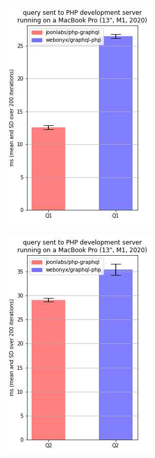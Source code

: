 \documentclass[11pt, a4paper]{article}
\begin{document}
\clearpage
\begin{figure}
\centering
\begin{subfigure}{.5\textwidth}
  \centering
  \includegraphics[width=.75\linewidth]{results/localhost_Q1.png}
  \label{localhost_Q1}
\end{subfigure}%
\begin{subfigure}{.5\textwidth}
  \centering
  \includegraphics[width=.75\linewidth]{results/localhost_Q2.png}

\end{subfigure}
\end{figure}
\end{document}
